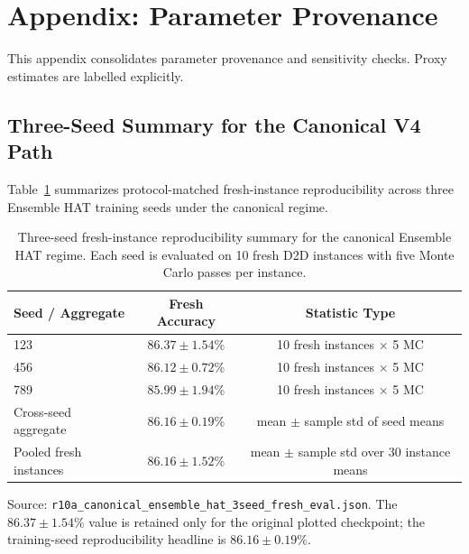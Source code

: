 \section{Appendix: Parameter Provenance}
\label{sec:appendix-provenance}

This appendix consolidates parameter provenance and sensitivity checks. Proxy estimates are labelled explicitly.

\subsection{Three-Seed Summary for the Canonical V4 Path}
\label{subsec:v4-rerun-sanity}

Table~\ref{tab:v4-three-seed-summary} summarizes protocol-matched fresh-instance reproducibility across three Ensemble HAT training seeds under the canonical regime.

\begin{table}[ht]
\centering
\caption{Three-seed fresh-instance reproducibility summary for the canonical Ensemble HAT regime. Each seed is evaluated on 10 fresh D2D instances with five Monte Carlo passes per instance.}
\label{tab:v4-three-seed-summary}
\begin{tabular}{lcc}
\toprule
\textbf{Seed / Aggregate} & \textbf{Fresh Accuracy} & \textbf{Statistic Type} \\
\midrule
123 & \(86.37\pm1.54\)\% & 10 fresh instances \(\times\) 5 MC \\
456 & \(86.12\pm0.72\)\% & 10 fresh instances \(\times\) 5 MC \\
789 & \(85.99\pm1.94\)\% & 10 fresh instances \(\times\) 5 MC \\
\midrule
Cross-seed aggregate & \(\mathbf{86.16\pm0.19}\)\% & mean \(\pm\) sample std of seed means \\
Pooled fresh instances & \(86.16\pm1.52\)\% & mean \(\pm\) sample std over 30 instance means \\
\bottomrule
\end{tabular}
\footnotesize Source: \texttt{r10a\_canonical\_ensemble\_hat\_3seed\_fresh\_eval.json}. The \(86.37\pm1.54\%\) value is retained only for the original plotted checkpoint; the training-seed reproducibility headline is \(86.16\pm0.19\%\).
\end{table}

\FloatBarrier

